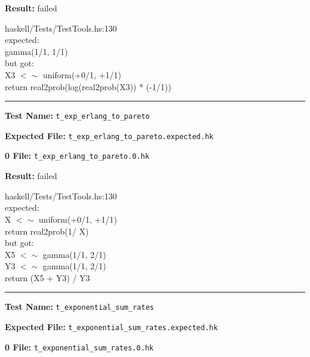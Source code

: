 \documentclass[11pt]{article}
\begin{document}
\bigskip


\bigskip
\textbf{Result:} failed

\bigskip
\noindent


\bigskip
\noindent
haskell/Tests/TestTools.hs:130\\expected:\\gamma(1/1, 1/1)\\but got:\\X3 $<\sim$ uniform(+0/1, +1/1)\\return real2prob(log(real2prob(X3)) * (-1/1))\\

\hrule

\bigskip
\textbf{Test Name:} {\tt t\_exp\_erlang\_to\_pareto}

\textbf{Expected File:} {\tt t\_exp\_erlang\_to\_pareto.expected.hk}

\bigskip


\bigskip
\textbf{0 File:} {\tt t\_exp\_erlang\_to\_pareto.0.hk}

\bigskip


\bigskip
\textbf{Result:} failed

\bigskip
\noindent


\bigskip
\noindent
haskell/Tests/TestTools.hs:130\\expected:\\X $<\sim$ uniform(+0/1, +1/1)\\return real2prob(1/ X)\\but got:\\X5 $<\sim$ gamma(1/1, 2/1)\\Y3 $<\sim$ gamma(1/1, 2/1)\\return (X5 + Y3) / Y3\\

\hrule

\bigskip
\textbf{Test Name:} {\tt t\_exponential\_sum\_rates}

\textbf{Expected File:} {\tt t\_exponential\_sum\_rates.expected.hk}

\bigskip


\bigskip
\textbf{0 File:} {\tt t\_exponential\_sum\_rates.0.hk}
\end{document}
